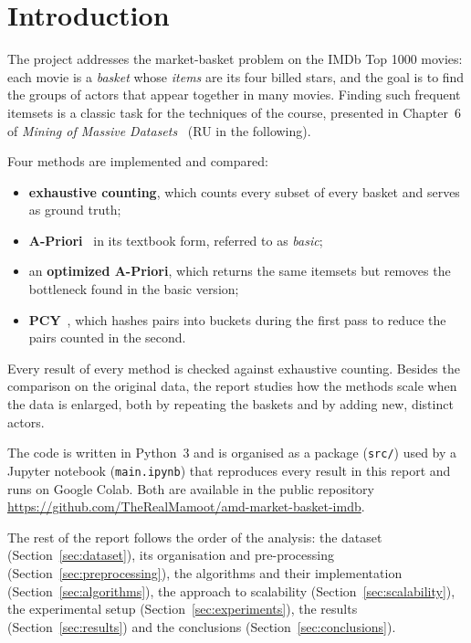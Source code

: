 \section{Introduction}

The project addresses the market-basket problem on the IMDb Top 1000 movies: each movie is a \emph{basket} whose \emph{items} are its four billed stars, and the goal is to find the groups of actors that appear together in many movies. Finding such frequent itemsets is a classic task for the techniques of the course, presented in Chapter~6 of \emph{Mining of Massive Datasets}~\cite{mmds} (RU in the following).

Four methods are implemented and compared:
\begin{itemize}
  \item \textbf{exhaustive counting}, which counts every subset of every basket and serves as ground truth;
  \item \textbf{A-Priori}~\cite{agrawal1994} in its textbook form, referred to as \emph{basic};
  \item an \textbf{optimized A-Priori}, which returns the same itemsets but removes the bottleneck found in the basic version;
  \item \textbf{PCY}~\cite{park1995}, which hashes pairs into buckets during the first pass to reduce the pairs counted in the second.
\end{itemize}
Every result of every method is checked against exhaustive counting. Besides the comparison on the original data, the report studies how the methods scale when the data is enlarged, both by repeating the baskets and by adding new, distinct actors.

The code is written in Python~3 and is organised as a package (\texttt{src/}) used by a Jupyter notebook (\texttt{main.ipynb}) that reproduces every result in this report and runs on Google Colab. Both are available in the public repository \url{https://github.com/TheRealMamoot/amd-market-basket-imdb}.

The rest of the report follows the order of the analysis: the dataset (Section~\ref{sec:dataset}), its organisation and pre-processing (Section~\ref{sec:preprocessing}), the algorithms and their implementation (Section~\ref{sec:algorithms}), the approach to scalability (Section~\ref{sec:scalability}), the experimental setup (Section~\ref{sec:experiments}), the results (Section~\ref{sec:results}) and the conclusions (Section~\ref{sec:conclusions}).
